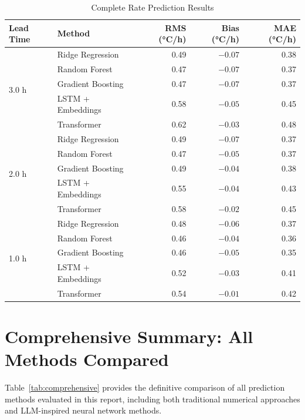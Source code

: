 \documentclass[11pt,letterpaper]{article}
\begin{document}
\begin{table}[H]
\centering
\caption{Complete Rate Prediction Results}
\label{tab:full_rate}
\small
\begin{tabular}{l|l|rrr}
\toprule
\textbf{Lead Time} & \textbf{Method} & \textbf{RMS (°C/h)} & \textbf{Bias (°C/h)} & \textbf{MAE (°C/h)} \\
\midrule
\multirow{5}{*}{3.0 h}
& Ridge Regression & 0.49 & $-0.07$ & 0.38 \\
& Random Forest & 0.47 & $-0.07$ & 0.37 \\
& Gradient Boosting & 0.47 & $-0.07$ & 0.37 \\
& LSTM + Embeddings & 0.58 & $-0.05$ & 0.45 \\
& Transformer & 0.62 & $-0.03$ & 0.48 \\
\midrule
\multirow{5}{*}{2.0 h}
& Ridge Regression & 0.49 & $-0.07$ & 0.37 \\
& Random Forest & 0.47 & $-0.05$ & 0.37 \\
& Gradient Boosting & 0.49 & $-0.04$ & 0.38 \\
& LSTM + Embeddings & 0.55 & $-0.04$ & 0.43 \\
& Transformer & 0.58 & $-0.02$ & 0.45 \\
\midrule
\multirow{5}{*}{1.0 h}
& Ridge Regression & 0.48 & $-0.06$ & 0.37 \\
& Random Forest & 0.46 & $-0.04$ & 0.36 \\
& Gradient Boosting & 0.46 & $-0.05$ & 0.35 \\
& LSTM + Embeddings & 0.52 & $-0.03$ & 0.41 \\
& Transformer & 0.54 & $-0.01$ & 0.42 \\
\bottomrule
\end{tabular}
\end{table}

\section{Comprehensive Summary: All Methods Compared}

Table~\ref{tab:comprehensive} provides the definitive comparison of all prediction methods evaluated in this report, including both traditional numerical approaches and LLM-inspired neural network methods.
\end{document}
